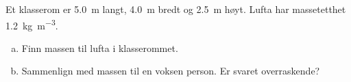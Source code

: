 %
Et klasserom er \SI{5.0}{\metre} langt, \SI{4.0}{\metre} bredt og \SI{2.5}{\metre} høyt. Lufta har massetetthet \SI{1.2}{\kilo\gram\per\metre\cubed}.
\begin{enumerate}[a)]
    \item Finn massen til lufta i klasserommet.
    \item Sammenlign med massen til en voksen person. Er svaret overraskende?
\end{enumerate}
%
